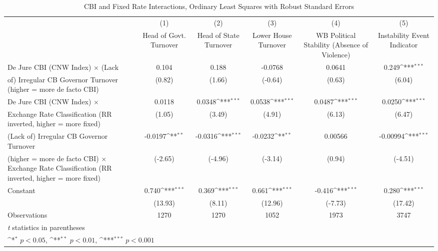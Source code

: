 \begin{table}[htbp]\centering
\def\sym#1{\ifmmode^{#1}\else\(^{#1}\)\fi}
\caption{CBI and Fixed Rate Interactions, Ordinary Least Squares with Robust Standard Errors \label{imultIndOLS}}
\begin{tabular}{l*{5}{c}}
\toprule
                                        &\multicolumn{1}{c}{(1)}&\multicolumn{1}{c}{(2)}&\multicolumn{1}{c}{(3)}&\multicolumn{1}{c}{(4)}&\multicolumn{1}{c}{(5)}\\
                                        &\multicolumn{1}{c}{Head of Govt. Turnover}&\multicolumn{1}{c}{Head of State Turnover}&\multicolumn{1}{c}{Lower House Turnover}&\multicolumn{1}{c}{WB Political Stability (Absence of Violence)}&\multicolumn{1}{c}{Instability Event Indicator}\\
\midrule
De Jure CBI (CNW Index) $\times$ (Lack  &    0.104         &    0.188         &  -0.0768         &   0.0641         &    0.249\sym{***}\\
of) Irregular CB Governor Turnover (higher = more de facto CBI)&   (0.82)         &   (1.66)         &  (-0.64)         &   (0.63)         &   (6.04)         \\
\addlinespace
De Jure CBI (CNW Index) $\times$        &   0.0118         &   0.0348\sym{***}&   0.0538\sym{***}&   0.0487\sym{***}&   0.0250\sym{***}\\
Exchange Rate Classification (RR inverted, higher = more fixed)&   (1.05)         &   (3.49)         &   (4.91)         &   (6.13)         &   (6.47)         \\
\addlinespace
(Lack of) Irregular CB Governor Turnover&  -0.0197\sym{**} &  -0.0316\sym{***}&  -0.0232\sym{**} &  0.00566         & -0.00994\sym{***}\\
(higher = more de facto CBI) $\times$ Exchange Rate Classification (RR inverted, higher = more fixed)&  (-2.65)         &  (-4.96)         &  (-3.14)         &   (0.94)         &  (-4.51)         \\
\addlinespace
Constant                                &    0.740\sym{***}&    0.369\sym{***}&    0.661\sym{***}&   -0.416\sym{***}&    0.280\sym{***}\\
                                        &  (13.93)         &   (8.11)         &  (12.96)         &  (-7.73)         &  (17.42)         \\
\midrule
Observations                            &     1270         &     1270         &     1052         &     1973         &     3747         \\
\bottomrule
\multicolumn{6}{l}{\footnotesize \textit{t} statistics in parentheses}\\
\multicolumn{6}{l}{\footnotesize \sym{*} \(p<0.05\), \sym{**} \(p<0.01\), \sym{***} \(p<0.001\)}\\
\end{tabular}
\end{table}
